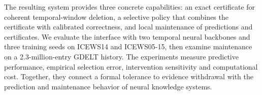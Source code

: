 The resulting system provides three concrete capabilities: an exact certificate for coherent temporal-window deletion, a selective policy that combines the certificate with calibrated correctness, and local maintenance of predictions and certificates. We evaluate the interface with two temporal neural backbones and three training seeds on ICEWS14 and ICEWS05-15, then examine maintenance on a 2.3-million-entry GDELT history. The experiments measure predictive performance, empirical selection error, intervention sensitivity and computational cost. Together, they connect a formal tolerance to evidence withdrawal with the prediction and maintenance behavior of neural knowledge systems.
